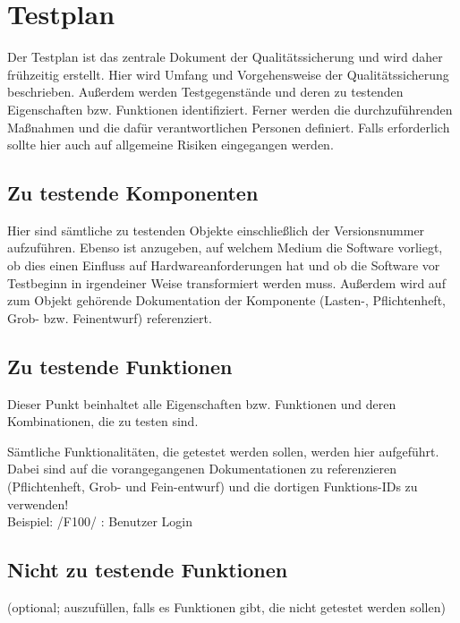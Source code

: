 
\chapter{Testplan}
Der Testplan ist das zentrale Dokument der Qualit\"atssicherung und wird daher
fr\"uhzeitig erstellt. Hier wird Umfang und Vorgehensweise der Qualit\"atssicherung
beschrieben. Außerdem werden Testgegenst\"ande und deren zu testenden
Eigenschaften bzw. Funktionen identifiziert. Ferner werden die
durchzuf\"uhrenden Maßnahmen und die daf\"ur verantwortlichen Personen definiert.
Falls erforderlich sollte hier auch auf allgemeine Risiken eingegangen werden.

\section{Zu testende Komponenten}
Hier sind s\"amtliche zu testenden Objekte einschließlich der Versionsnummer aufzuf\"uhren.
Ebenso ist anzugeben, auf welchem Medium die Software vorliegt, ob dies einen Einfluss auf Hardwareanforderungen hat
und ob die Software vor Testbeginn in irgendeiner Weise transformiert werden muss. Außerdem wird auf zum
Objekt geh\"orende Dokumentation der Komponente (Lasten-, Pflichtenheft, Grob-
bzw. Feinentwurf) referenziert.

\section{Zu testende Funktionen}
Dieser Punkt beinhaltet alle Eigenschaften bzw. Funktionen und deren
Kombinationen, die zu testen sind.

S\"amtliche Funktionalit\"aten, die getestet werden sollen, werden hier aufgef\"uhrt.
Dabei sind auf die vorangegangenen Dokumentationen zu referenzieren
(Pflichtenheft, Grob- und Fein-entwurf) und die dortigen Funktions-IDs zu
verwenden!\\ Beispiel: /F100/ : Benutzer Login


\section{Nicht zu testende Funktionen}
(optional; auszuf\"ullen, falls es Funktionen gibt, die nicht getestet werden
sollen)\\

